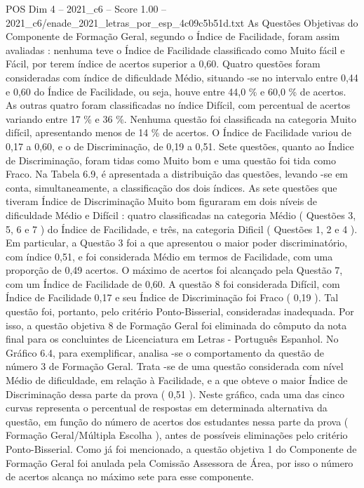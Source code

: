 \begin{textsample}{POS Dim 4 – 2021\_c6 – Score 1.00 – 2021\_c6/enade\_2021\_letras\_por\_esp\_4c09c5b51d.txt}
As Questões Objetivas do Componente de Formação Geral, segundo o Índice de Facilidade, foram assim avaliadas : nenhuma teve o Índice de Facilidade classificado como Muito fácil e Fácil, por terem índice de acertos superior a 0,60.
Quatro questões foram consideradas com índice de dificuldade Médio, situando -se no intervalo entre 0,44 e 0,60 do Índice de Facilidade, ou seja, houve entre 44,0 \% e 60,0 \% de acertos.
As outras quatro foram classificadas no índice Difícil, com percentual de acertos variando entre 17 \% e 36 \%.
Nenhuma questão foi classificada na categoria Muito difícil, apresentando menos de 14 \% de acertos.
O Índice de Facilidade variou de 0,17 a 0,60, e o de Discriminação, de 0,19 a 0,51.
Sete questões, quanto ao Índice de Discriminação, foram tidas como Muito bom e uma questão foi tida como Fraco.
Na Tabela 6.9, é apresentada a distribuição das questões, levando -se em conta, simultaneamente, a classificação dos dois índices.
As sete questões que tiveram Índice de Discriminação Muito bom figuraram em dois níveis de dificuldade Médio e Difícil : quatro classificadas na categoria Médio ( Questões 3, 5, 6 e 7 ) do Índice de Facilidade, e três, na categoria Dificil ( Questões 1, 2 e 4 ).
Em particular, a Questão 3 foi a que apresentou o maior poder discriminatório, com índice 0,51, e foi considerada Médio em termos de Facilidade, com uma proporção de 0,49 acertos.
O máximo de acertos foi alcançado pela Questão 7, com um Índice de Facilidade de 0,60.
A questão 8 foi considerada Difícil, com Índice de Facilidade 0,17 e seu Índice de Discriminação foi Fraco ( 0,19 ).
Tal questão foi, portanto, pelo critério Ponto-Bisserial, consideradas inadequada.
Por isso, a questão objetiva 8 de Formação Geral foi eliminada do cômputo da nota final para os concluintes de Licenciatura em Letras - Português Espanhol.
No Gráfico 6.4, para exemplificar, analisa -se o comportamento da questão de número 3 de Formação Geral.
Trata -se de uma questão considerada com nível Médio de dificuldade, em relação à Facilidade, e a que obteve o maior Índice de Discriminação dessa parte da prova ( 0,51 ).
Neste gráfico, cada uma das cinco curvas representa o percentual de respostas em determinada alternativa da questão, em função do número de acertos dos estudantes nessa parte da prova ( Formação Geral/Múltipla Escolha ), antes de possíveis eliminações pelo critério Ponto-Bisserial.
Como já foi mencionado, a questão objetiva 1 do Componente de Formação Geral foi anulada pela Comissão Assessora de Área, por isso o número de acertos alcança no máximo sete para esse componente.

\end{textsample}
